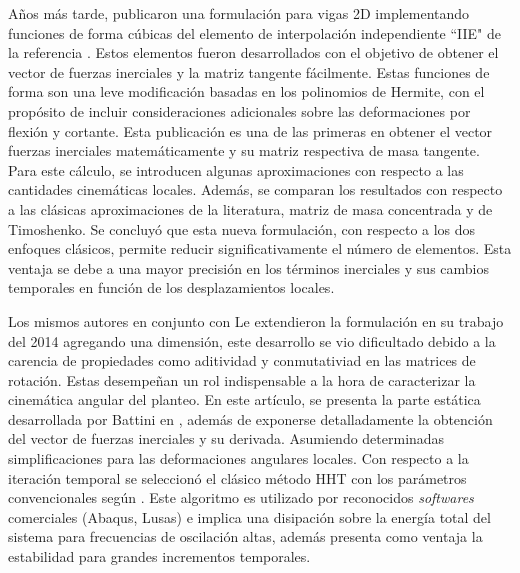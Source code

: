 Años más tarde, \cite{Le2011} publicaron una formulación para vigas 2D implementando funciones de forma cúbicas del elemento de interpolación independiente ``IIE" de la referencia  \cite{reddy1997locking}. Estos elementos fueron desarrollados con el objetivo de obtener el vector de fuerzas inerciales y la matriz tangente fácilmente. Estas funciones de forma son una leve modificación basadas en los polinomios de Hermite, con el propósito de incluir consideraciones adicionales sobre las deformaciones por flexión y cortante. Esta publicación es una de las primeras en obtener el vector fuerzas inerciales matemáticamente y su matriz respectiva de masa tangente. Para este cálculo, se introducen algunas aproximaciones con respecto a las cantidades cinemáticas locales. Además, se comparan los resultados con respecto a las clásicas aproximaciones de la literatura, matriz de masa concentrada y de Timoshenko. Se concluyó que esta nueva formulación, con respecto a los dos enfoques clásicos, permite reducir significativamente el número de elementos. Esta ventaja se debe a una mayor precisión en los términos inerciales y sus cambios temporales en función de los desplazamientos locales.    

Los mismos autores en conjunto con Le extendieron la formulación en su trabajo del 2014 \cite{Le2014} agregando una dimensión, este desarrollo se vio dificultado debido a la carencia de propiedades como aditividad y conmutativiad en las matrices de rotación. Estas desempeñan un rol indispensable a la hora de caracterizar la cinemática angular del planteo. En este artículo, se presenta la parte estática desarrollada por Battini en \cite{Battini2002}, además de exponerse detalladamente la obtención del vector de fuerzas inerciales y su derivada. Asumiendo determinadas simplificaciones para las deformaciones angulares locales. Con respecto a la iteración temporal se seleccionó el clásico método \gls{HHT} con los parámetros convencionales según \cite{hilber1977improved}. Este algoritmo es utilizado por reconocidos \textit{softwares}  comerciales (Abaqus, Lusas) e implica una disipación sobre la energía total del sistema para frecuencias de oscilación altas, además presenta como ventaja la estabilidad para grandes incrementos temporales. 

